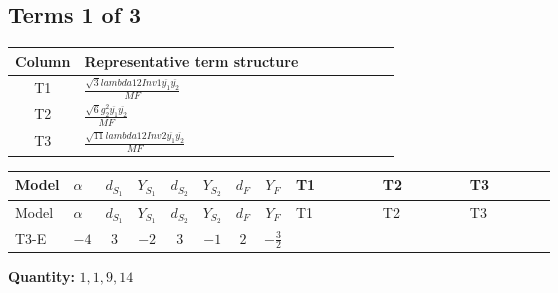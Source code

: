 \documentclass[8pt]{article}
\begin{document}
\begin{landscape}
\subsection*{Terms 1 of 3}
\begin{center}
\begin{tabular}{@{}c >{\raggedright\arraybackslash}p{0.82\linewidth}@{}}
\toprule
Column & Representative term structure \\
\midrule
T1 & \(\displaystyle \frac{\sqrt{3} lambda12Inv1 \overline{y_{1}} \overline{y_{2}}}{MF}\) \\
\midrule
T2 & \(\displaystyle \frac{\sqrt{6} g_{2}^{2} \overline{y_{1}} \overline{y_{2}}}{MF}\) \\
\midrule
T3 & \(\displaystyle \frac{\sqrt{11} lambda12Inv2 \overline{y_{1}} \overline{y_{2}}}{MF}\) \\
\midrule
\bottomrule
\end{tabular}
\end{center}
\smallskip
\tiny
\begin{longtable}{@{}llcccccc >{\raggedright\arraybackslash}p{0.21\linewidth} >{\raggedright\arraybackslash}p{0.21\linewidth} >{\raggedright\arraybackslash}p{0.21\linewidth}@{}}
\toprule
Model & $\alpha$ & $d_{S_1}$ & $Y_{S_1}$ & $d_{S_2}$ & $Y_{S_2}$ & $d_F$ & $Y_F$ & T1 & T2 & T3 \\
\midrule
\endfirsthead
\toprule
Model & $\alpha$ & $d_{S_1}$ & $Y_{S_1}$ & $d_{S_2}$ & $Y_{S_2}$ & $d_F$ & $Y_F$ & T1 & T2 & T3 \\
\midrule
\endhead
T3-E & $-4$ & $3$ & $-2$ & $3$ & $-1$ & $2$ & $-\frac{3}{2}$ & \scriptsize\adjustbox{max width=\linewidth}{$\begin{gathered} - \frac{\sqrt{3} lambda12Inv1 \overline{y_{1}} \overline{y_{2}}}{6 MF}\end{gathered}$} & \scriptsize\adjustbox{max width=\linewidth}{$\begin{gathered} \frac{\sqrt{6} g_{2}^{2} \overline{y_{1}} \overline{y_{2}}}{3 MF}\end{gathered}$} & \scriptsize\adjustbox{max width=\linewidth}{$\begin{gathered} \frac{3 \sqrt{11} lambda12Inv2 \overline{y_{1}} \overline{y_{2}}}{22 MF}\end{gathered}$} \\
\midrule
\bottomrule
\end{longtable}
\clearpage
\noindent\textbf{Quantity: }$\mathrm{1,1,9,14}$\par\smallskip

\end{landscape}
\end{document}
